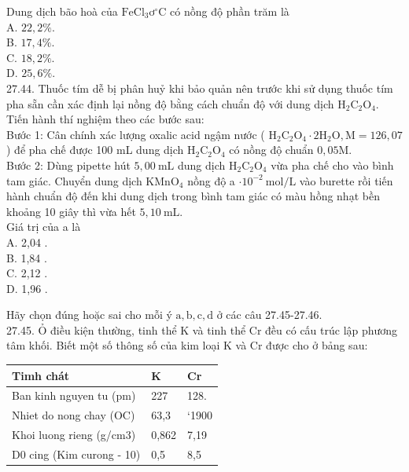 \documentclass[10pt]{article}
\begin{document}
Dung dịch bão hoà của $\mathrm{FeCl}_{3} \mathrm{ơ}^{\circ} \mathrm{C}$ có nồng độ phần trăm là\\
A. $22,2 \%$.\\
B. $17,4 \%$.\\
C. $18,2 \%$.\\
D. $25,6 \%$.\\
27.44. Thuốc tím dễ bị phân huỷ khi bảo quản nên trước khi sử dụng thuốc tím pha sẵn cần xác định lại nồng độ bằng cách chuẩn độ với dung dịch $\mathrm{H}_{2} \mathrm{C}_{2} \mathrm{O}_{4}$.\\
Tiến hành thí nghiệm theo các bước sau:\\
Bước 1: Cân chính xác lượng oxalic acid ngậm nước ( $\mathrm{H}_{2} \mathrm{C}_{2} \mathrm{O}_{4} \cdot 2 \mathrm{H}_{2} \mathrm{O}, \mathrm{M}=126,07$ ) để pha chế được 100 mL dung dịch $\mathrm{H}_{2} \mathrm{C}_{2} \mathrm{O}_{4}$ có nồng độ chuẩn $0,05 \mathrm{M}$.\\
Bước 2: Dùng pipette hút $5,00 \mathrm{~mL}$ dung dịch $\mathrm{H}_{2} \mathrm{C}_{2} \mathrm{O}_{4}$ vừa pha chế cho vào bình tam giác. Chuyển dung dịch $\mathrm{KMnO}_{4}$ nồng độ a $\cdot 10^{-2} \mathrm{~mol} / \mathrm{L}$ vào burette rồi tiến hành chuẩn độ đến khi dung dịch trong bình tam giác có màu hồng nhạt bền khoảng 10 giây thì vừa hết $5,10 \mathrm{~mL}$.\\
Giá trị của a là\\
A. 2,04 .\\
B. 1,84 .\\
C. 2,12 .\\
D. 1,96 .

Hãy chọn đúng hoặc sai cho mỗi ý $\mathrm{a}, \mathrm{b}, \mathrm{c}, \mathrm{d}$ ở các câu 27.45-27.46.\\
27.45. Ỏ điều kiện thường, tinh thể K và tinh thể Cr đều có cấu trúc lập phương tâm khối. Biết một số thông số của kim loại K và Cr được cho ở bảng sau:

\begin{tabular}{|l|l|l|}
\hline
Timh chát & K & Cr \\
\hline
Ban kinh nguyen tu (pm) & 227 & 128. \\
\hline
Nhiet do nong chay (OC) & 63,3 & `1900 \\
\hline
Khoi luong rieng (g/cm3) & 0,862 & 7,19 \\
\hline
D0 cing (Kim curong - 10) & 0,5 & 8,5 \\
\hline
\end{tabular}
\end{document}
